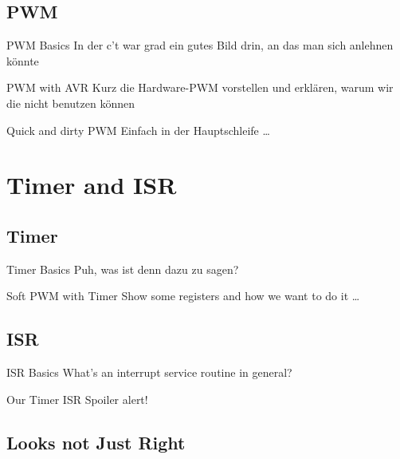 \documentclass{beamer}
\begin{document}
\subsection{PWM}

\begin{frame}{PWM Basics}
    In der c't war grad ein gutes Bild drin, an das man sich anlehnen könnte
\end{frame}

\begin{frame}{PWM with AVR}
    Kurz die Hardware-PWM vorstellen und erklären, warum wir die nicht benutzen können
\end{frame}

\begin{frame}{Quick and dirty PWM}
    Einfach in der Hauptschleife …
\end{frame}

\section{Timer and ISR}

\subsection{Timer}

\begin{frame}{Timer Basics}
    Puh, was ist denn dazu zu sagen?
\end{frame}

\begin{frame}{Soft PWM with Timer}
    Show some registers and how we want to do it …
\end{frame}

\subsection{ISR}

\begin{frame}{ISR Basics}
    What's an interrupt service routine in general?
\end{frame}

\begin{frame}{Our Timer ISR}
    Spoiler alert!
\end{frame}

\subsection{Looks not Just Right}
\end{document}
